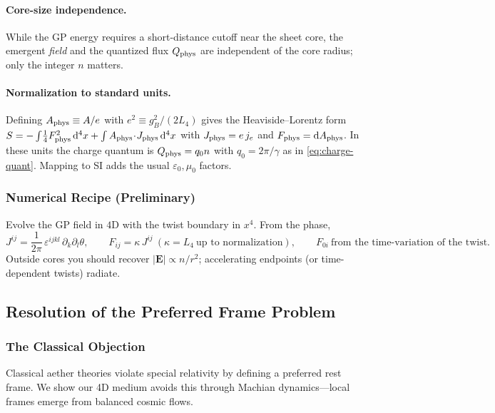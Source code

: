 \paragraph{Core-size independence.}
While the GP energy requires a short-distance cutoff near the sheet core, the emergent \emph{field} and the quantized flux $Q_{\rm phys}$ are independent of the core radius; only the integer $n$ matters.

\paragraph{Normalization to standard units.}
Defining $A_{\rm phys}\equiv A/e$ with $e^2\equiv g_B^2/(2L_4)$ gives the Heaviside--Lorentz form $S=-\int\!\frac14 F_{\rm phys}^2\,\mathrm d^4x+\int A_{\rm phys}\!\cdot\!J_{\rm phys}\,\mathrm d^4x$ with $J_{\rm phys}=e\,j_e$ and $F_{\rm phys}=\mathrm dA_{\rm phys}$. In these units the charge quantum is $Q_{\rm phys}=q_0 n$ with $q_0=2\pi/\gamma$ as in \eqref{eq:charge-quant}. Mapping to SI adds the usual $\varepsilon_0,\mu_0$ factors.

\subsubsection{Numerical Recipe (Preliminary)}
Evolve the GP field in $4$D with the twist boundary in $x^4$. From the phase,
\begin{equation}
J^{ij}=\frac{1}{2\pi}\,\varepsilon^{ijkl}\,\partial_k\partial_l\theta,\qquad
F_{ij}=\kappa\,J^{ij}\ (\kappa=L_4\ \text{up to normalization}),\qquad
F_{0i}\ \text{from the time-variation of the twist}.
\end{equation}
Outside cores you should recover $|\mathbf E|\propto n/r^2$; accelerating endpoints (or time-dependent twists) radiate.

\subsection{Resolution of the Preferred Frame Problem}

\subsubsection{The Classical Objection}

Classical aether theories violate special relativity by defining a preferred rest frame. We show our 4D medium avoids this through Machian dynamics---local frames emerge from balanced cosmic flows.

